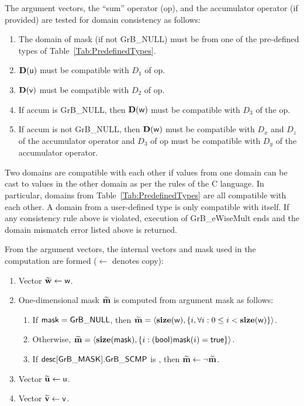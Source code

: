 The argument vectors, the ``sum'' operator ({\sf op}), and the accumulator 
operator (if provided) are tested for domain consistency as follows:
\begin{enumerate}
	\item The domain of {\sf mask} (if not {\sf GrB\_NULL}) must be from one of the pre-defined types of Table~\ref{Tab:PredefinedTypes}.

	\item $\bold{D}({\sf u})$ must be compatible with $D_1$ of {\sf op}.

	\item $\bold{D}({\sf v})$ must be compatible with $D_2$ of {\sf op}.

	\item If {\sf accum} is {\sf GrB\_NULL}, then $\bold{D}({\sf w})$ must be 
    compatible with $D_3$ of the {\sf op}.

	\item If {\sf accum} is not {\sf GrB\_NULL}, then $\bold{D}({\sf w})$ must be
    compatible with $D_x$ and $D_z$ of the accumulator operator and $D_3$ of
    {\sf op} must be compatible with $D_y$ of the accumulator operator.
\end{enumerate}
Two domains are compatible with each other if values from one domain can be cast 
to values in the other domain as per the rules of the C language.
In particular, domains from Table~\ref{Tab:PredefinedTypes} are all compatible 
with each other. A domain from a user-defined type is only compatible with itself.
If any consistency rule above is violated, execution of {\sf GrB\_eWiseMult} ends
and the domain mismatch error listed above is returned.

From the argument vectors, the internal vectors and mask used in 
the computation are formed ($\leftarrow$ denotes copy):
\begin{enumerate}
	\item Vector ${\bf \widetilde{w}} \leftarrow {\sf w}$.

	\item One-dimensional mask ${\bf \widetilde{m}}$ is computed from 
    argument {\sf mask} as follows:
	\begin{enumerate}
		\item	If ${\sf mask} = {\sf GrB\_NULL}$, then ${\bf \widetilde{m}} = 
        \langle \bold{size}({\sf w}), \{i, \forall i : 0 \leq i < 
        \bold{size}({\sf w}) \} \rangle$.

		\item	Otherwise, ${\bf \widetilde{m}} = 
        \langle \bold{size}({\sf mask}), \{i : ({\sf bool}){\sf mask}(i) = 
        {\sf true}\} \rangle$.

		\item	If ${\sf desc[GrB\_MASK].GrB\_SCMP}$ is \true, then ${\bf \widetilde{m}} \leftarrow \neg {\bf \widetilde{m}}$.
	\end{enumerate}

	\item Vector ${\bf \widetilde{u}} \leftarrow {\sf u}$.

	\item Vector ${\bf \widetilde{v}} \leftarrow {\sf v}$.
\end{enumerate}

